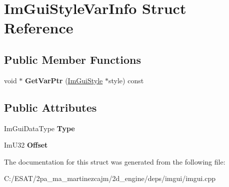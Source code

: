 \hypertarget{struct_im_gui_style_var_info}{}\section{Im\+Gui\+Style\+Var\+Info Struct Reference}
\label{struct_im_gui_style_var_info}
\subsection*{Public Member Functions}
\begin{DoxyCompactItemize}
\item 
\mbox{\label{struct_im_gui_style_var_info_a92aebc5f0d8b2b43b61dbcaf992b5643}} 
void $\ast$ {\bfseries Get\+Var\+Ptr} (\hyperlink{struct_im_gui_style}{Im\+Gui\+Style} $\ast$style) const
\end{DoxyCompactItemize}
\subsection*{Public Attributes}
\begin{DoxyCompactItemize}
\item 
\mbox{\label{struct_im_gui_style_var_info_a62f42d2bb7b71b7530493e16e622cb81}} 
Im\+Gui\+Data\+Type {\bfseries Type}
\item 
\mbox{\label{struct_im_gui_style_var_info_ae900d6a02166d3d0433c18b95aec10e8}} 
Im\+U32 {\bfseries Offset}
\end{DoxyCompactItemize}


The documentation for this struct was generated from the following file\+:\begin{DoxyCompactItemize}
\item 
C\+:/\+E\+S\+A\+T/2pa\+\_\+ma\+\_\+martinezcajm/2d\+\_\+engine/deps/imgui/imgui.\+cpp\end{DoxyCompactItemize}
